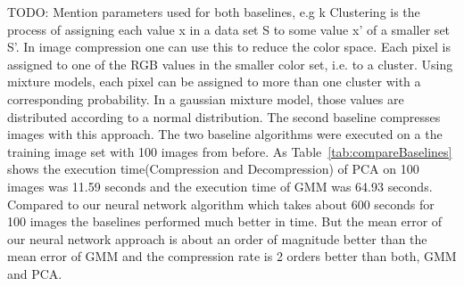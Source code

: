 \newline
TODO: Mention parameters used for both baselines, e.g k
\newline
\newline
Clustering is the process of assigning each value x in a data set S to some value x' of a smaller set S'. In image compression one can use this to reduce the color space. Each pixel is assigned to one of the RGB values in the smaller color set, i.e. to a cluster. Using mixture models, each pixel can be assigned to more than one cluster with a corresponding probability. In a gaussian mixture model, those values are distributed according to a normal distribution. The second baseline compresses images with this approach. 
\newline
The two baseline algorithms were executed on a the training image set with 100 images from before. As Table~\ref{tab:compareBaselines} shows the execution time(Compression and Decompression) of PCA on 100 images was 11.59 seconds and the execution time of GMM was 64.93 seconds. Compared to our neural network algorithm which takes about 600 seconds for 100 images the baselines performed much better in time. But the mean error of our neural network approach is about an order of magnitude better than the mean error of GMM and the compression rate is 2 orders better than both, GMM and PCA.





